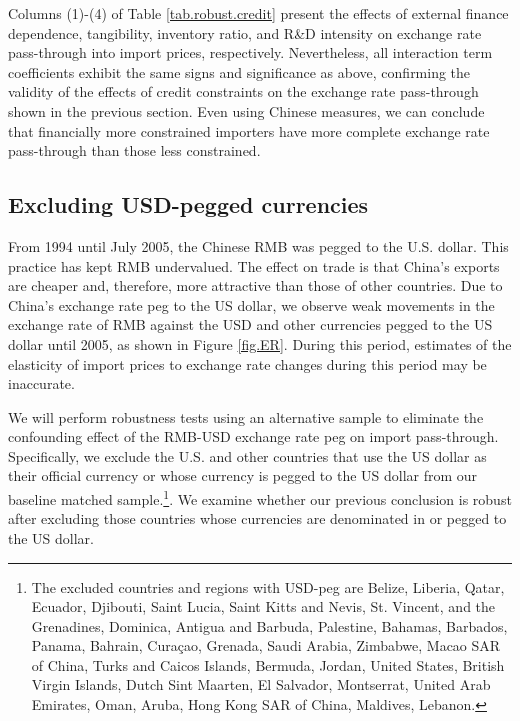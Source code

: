 \documentclass[12pt]{article}
\begin{document}
Columns (1)-(4) of Table \ref{tab.robust.credit} present the effects of external finance dependence, tangibility, inventory ratio, and R\&D intensity on exchange rate pass-through into import prices, respectively. Nevertheless, all interaction term coefficients exhibit the same signs and significance as above, confirming the validity of the effects of credit constraints on the exchange rate pass-through shown in the previous section. Even using Chinese measures, we can conclude that financially more constrained importers have more complete exchange rate pass-through than those less constrained.

\subsection{Excluding USD-pegged currencies}

From 1994 until July 2005, the Chinese RMB was pegged to the U.S. dollar. This practice has kept RMB undervalued. The effect on trade is that China's exports are cheaper and, therefore, more attractive than those of other countries. Due to China's exchange rate peg to the US dollar, we observe weak movements in the exchange rate of RMB against the USD and other currencies pegged to the US dollar until 2005, as shown in Figure \ref{fig.ER}. During this period, estimates of the elasticity of import prices to exchange rate changes during this period may be inaccurate.

We will perform robustness tests using an alternative sample to eliminate the confounding effect of the RMB-USD exchange rate peg on import pass-through. Specifically, we exclude the U.S. and other countries that use the US dollar as their official currency or whose currency is pegged to the US dollar from our baseline matched sample.\footnote{The excluded countries and regions with USD-peg are Belize, Liberia, Qatar, Ecuador, Djibouti, Saint Lucia, Saint Kitts and Nevis, St. Vincent, and the Grenadines, Dominica, Antigua and Barbuda, Palestine, Bahamas, Barbados, Panama, Bahrain, Curaçao, Grenada, Saudi Arabia, Zimbabwe, Macao SAR of China, Turks and Caicos Islands, Bermuda, Jordan, United States, British Virgin Islands, Dutch Sint Maarten, El Salvador, Montserrat, United Arab Emirates, Oman, Aruba, Hong Kong SAR of China, Maldives, Lebanon.}. We examine whether our previous conclusion is robust after excluding those countries whose currencies are denominated in or pegged to the US dollar.
\end{document}
